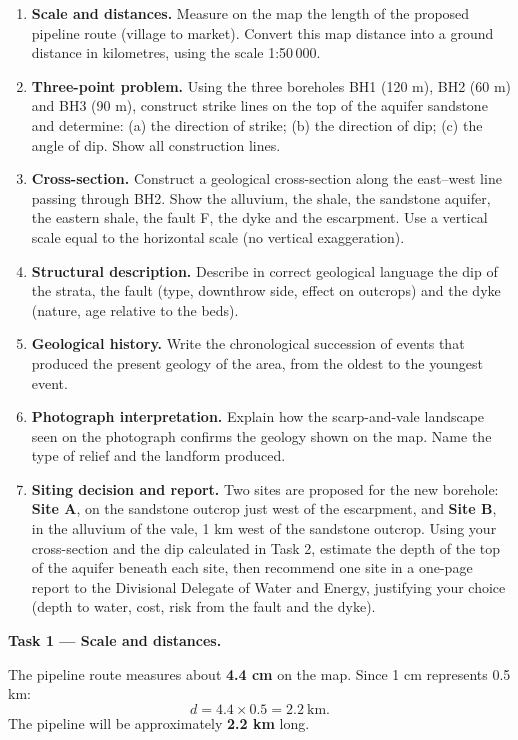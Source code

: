 \documentclass[11pt]{article}
\newcounter{popsec}
\newcounter{popsub}
\newcommand{\courssub}[1]{%
  \stepcounter{popsub}%
  \par\vspace{9pt}\noindent{\popxbold\fontsize{11.5}{13}\selectfont\color{popink}{\color{poporange}\thepopsec.\thepopsub}\hspace{6pt}#1}\par\nopagebreak\vspace{4pt}
}
\begin{document}
\begin{enumerate}
\item \textbf{Scale and distances.} Measure on the map the length of the proposed pipeline route (village to market). Convert this map distance into a ground distance in kilometres, using the scale 1:50\,000.
\item \textbf{Three-point problem.} Using the three boreholes BH1 (120 m), BH2 (60 m) and BH3 (90 m), construct strike lines on the top of the aquifer sandstone and determine: (a) the direction of strike; (b) the direction of dip; (c) the angle of dip. Show all construction lines.
\item \textbf{Cross-section.} Construct a geological cross-section along the east--west line passing through BH2. Show the alluvium, the shale, the sandstone aquifer, the eastern shale, the fault F, the dyke and the escarpment. Use a vertical scale equal to the horizontal scale (no vertical exaggeration).
\item \textbf{Structural description.} Describe in correct geological language the dip of the strata, the fault (type, downthrow side, effect on outcrops) and the dyke (nature, age relative to the beds).
\item \textbf{Geological history.} Write the chronological succession of events that produced the present geology of the area, from the oldest to the youngest event.
\item \textbf{Photograph interpretation.} Explain how the scarp-and-vale landscape seen on the photograph confirms the geology shown on the map. Name the type of relief and the landform produced.
\item \textbf{Siting decision and report.} Two sites are proposed for the new borehole: \textbf{Site A}, on the sandstone outcrop just west of the escarpment, and \textbf{Site B}, in the alluvium of the vale, 1 km west of the sandstone outcrop. Using your cross-section and the dip calculated in Task 2, estimate the depth of the top of the aquifer beneath each site, then recommend one site in a one-page report to the Divisional Delegate of Water and Energy, justifying your choice (depth to water, cost, risk from the fault and the dyke).
\end{enumerate}

\courssub{Model answer}

\textbf{Task 1 — Scale and distances.}\par
The pipeline route measures about \textbf{4.4 cm} on the map. Since 1 cm represents 0.5 km:
\[
d = 4.4 \times 0.5 = 2.2\ \mathrm{km}.
\]
The pipeline will be approximately \textbf{2.2 km} long.
\end{document}
